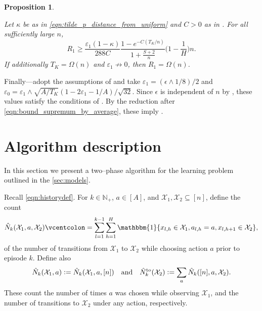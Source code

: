 \documentclass[11pt]{article}
\newcommand{\eqdef}{\vcentcolon=}
\newcommand{\mbb}[1]{\mathbbm{#1}}
\newcommand{\mcX}{\mathcal{X}}
\newcommand{\mbbN}{\mathbb{N}}
\newtheorem{proposition}[theorem]{Proposition}
\theoremstyle{definition}
\theoremstyle{definition}
\begin{document}
\begin{proposition}
	\label{prop:decoding_function_regret_lower_bound}

	Let $\kappa$ be as in \eqref{eqn:tilde_p_distance_from_uniform} and $C>0$ as in .
	For all sufficiently large $n$,
	\begin{equation}
		R_1
		\geq
        \frac{\varepsilon_1(1-\kappa)}{288C}
        \frac{1-e^{-C(T_K/n)}}{1+\frac{S+2}{n}}
        \biggl(1-\frac{1}{H}\biggr)
        n
		.
		\label{eqn:decoding_function_regret_lower_bound}
	\end{equation}
	If additionally $T_K=\Omega(n)$ and $\varepsilon_1\not\rightarrow 0$, then $R_1=\Omega(n)$.
\end{proposition}

Finally---adopt the assumptions of  and take $\varepsilon_1 = (\epsilon \wedge 1/8)/2$ and $\varepsilon_0 = \varepsilon_1\wedge \sqrt{A/T_K}(1-2\varepsilon_1-1/A)/\sqrt{32}$.
Since $\epsilon$ is independent of $n$ by , these values satisfy the conditions of .
By the reduction after \eqref{eqn:bound_supremum_by_average}, these imply .

\section{Algorithm description}
\label{sec:algorithm}

In this section we present a two--phase algorithm for the learning problem outlined in the \cref{sec:models}.

Recall \eqref{eqn:historydef}.
For $k\in\mbbN_+$, $a\in[A]$, and $\mcX_1,\mcX_2\subseteq[n]$, define the count
\begin{equation}
	\label{eqn:countsdef}
	\hat{N}_{k}(\mcX_1,a,\mcX_2)\eqdef \sum_{l=1}^{k-1}\sum_{h=1}^H\mbb{1}\{x_{l,h}\in\mcX_1,a_{l,h}=a,x_{l,h+1}\in\mcX_2\}
	,
\end{equation}
of the number of transitions from $\mcX_1$ to $\mcX_2$ while choosing action $a$ prior to episode $k$.
Define also
\begin{equation}
	\label{eqn:countsdef_overload}
	\hat{N}_{k}(\mcX_1,a)\eqdef \hat{N}_{k}(\mcX_1,a,[n])\quad \mathrm{and} \quad
	\hat{N}_{k}^{\mathrm{to}}(\mcX_2)\eqdef \sum_{a}\hat{N}_{k}([n],a,\mcX_2).
\end{equation}
These count the number of times $a$ was chosen while observing $\mcX_1$, and the number of transitions to $\mcX_2$ under any action, respectively.
\end{document}
